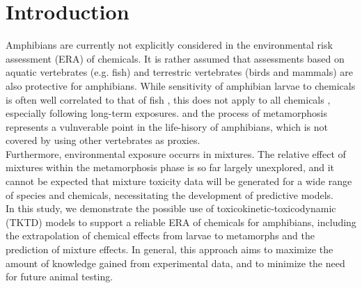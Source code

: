 \documentclass[utf8]{FrontiersinHarvard} %
\begin{document}
\section{Introduction}
%
Amphibians are currently not explicitly considered in the environmental risk assessment (ERA) of chemicals. 
It is rather assumed that assessments based on aquatic vertebrates (e.g. fish) 
and terrestric vertebrates (birds and mammals) are also protective for amphibians. 
While sensitivity of amphibian larvae to chemicals is often well correlated to that of fish \citep{weltjeCOMPARATIVEACUTECHRONIC2013}, 
this does not apply to all chemicals \citep{glabermanEvaluatingRoleFish2019}, especially following long-term exposures.
and the process of metamorphosis represents a vulnverable point in the life-hisory of amphibians, 
which is not covered by using other vertebrates as proxies.\\
Furthermore, environmental exposure occurrs in mixtures. 
The relative effect of mixtures within the metamorphosis phase is so far largely unexplored, 
and it cannot be expected that mixture toxicity data will be generated for a wide range 
of species and chemicals, necessitating the development of predictive models.\\
%
In this study, we demonstrate the possible use of toxicokinetic-toxicodynamic (TKTD) models 
to support a reliable ERA of chemicals for amphibians, including the extrapolation 
of chemical effects from larvae to metamorphs and the prediction of mixture effects. 
In general, this approach aims to maximize the amount of knowledge gained 
from experimental data, 
and to minimize the need for future animal testing. \\
%
\end{document}
